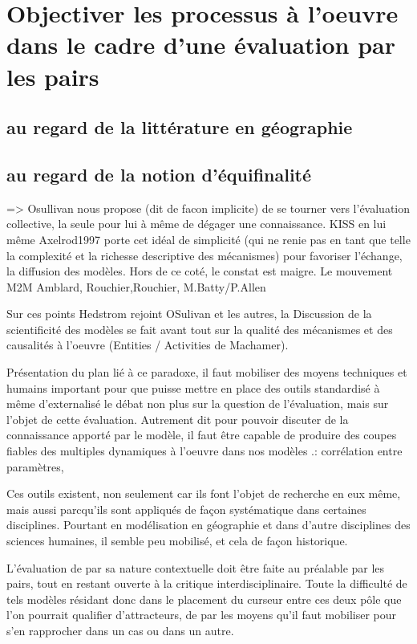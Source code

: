 \section{Objectiver les processus à l'oeuvre dans le cadre d'une évaluation par les pairs}

\subsection{au regard de la littérature en géographie}

\subsection{au regard de la notion d'équifinalité}

=> Osullivan nous propose (dit de facon implicite) de se tourner  vers l'évaluation collective, la seule pour lui à même de dégager une connaissance. KISS en lui même {Axelrod1997} porte cet idéal de simplicité (qui ne renie pas en tant que telle la complexité et la richesse descriptive des mécanismes) pour favoriser l'échange, la diffusion des modèles. Hors de ce coté, le constat est maigre. Le mouvement M2M {Amblard, Rouchier},{Rouchier}, {M.Batty/P.Allen}

Sur ces points Hedstrom rejoint OSulivan et les autres, la Discussion de la scientificité des modèles se fait avant tout sur la qualité des mécanismes et des causalités à l'oeuvre (Entities / Activities de Machamer).  

Présentation du plan lié à ce paradoxe, il faut mobiliser des moyens techniques et humains important pour que puisse mettre  en place des outils standardisé à même d'externalisé le débat non plus sur la question de l'évaluation, mais sur l'objet de cette évaluation. Autrement dit pour pouvoir discuter de la connaissance apporté par le modèle, il faut être capable de produire des coupes fiables des multiples dynamiques à l'oeuvre dans nos modèles .: corrélation entre paramètres, 

Ces outils existent, non seulement car ils font l'objet de recherche en eux même, mais aussi parcqu'ils sont appliqués de façon systématique dans certaines disciplines. Pourtant en modélisation en géographie et dans d'autre disciplines des sciences humaines, il semble peu mobilisé, et cela de façon historique.

L'évaluation de par sa nature contextuelle doit être faite au préalable par les pairs, tout en restant ouverte à la critique interdisciplinaire. Toute la difficulté de tels modèles résidant donc dans le placement du curseur entre ces deux pôle que l'on pourrait qualifier d'attracteurs, de par les moyens qu'il faut mobiliser pour s'en rapprocher dans un cas ou dans un autre.

